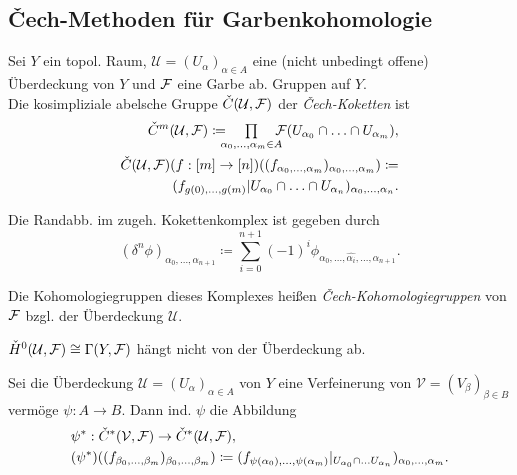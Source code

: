 \documentclass{cheat-sheet}
\newcommand{\nspace}[1]{\foreach \i in {1,...,#1}{ \! }} %
\begin{document}
\subsection{Čech-Methoden für Garbenkohomologie}


\begin{defn}
  Sei $Y$ ein topol. Raum, $\mathcal{U} = (U_\alpha)_{\alpha \in A}$ eine (nicht unbedingt offene) Überdeckung von $Y$ und $\mathcal{F}$ eine Garbe ab. Gruppen auf $Y$. \\
  Die kosimpliziale abelsche Gruppe $\check{C}(\mathcal{U}, \mathcal{F})$ der \emph{Čech-Koketten} ist
  \begin{align*}
    \check{C}^m(\mathcal{U}, \Fais) \coloneqq \nspace{4} \prod_{\alpha_0, \ldots, \alpha_m \in A} \nspace{4} \Fais(U_{\alpha_0} \cap \ldots \cap U_{\alpha_m}), \\
    \check{C}(\mathcal{U}, \Fais)(f : [m] \to [n])((f_{\alpha_0, \ldots ,\alpha_m})_{\alpha_0, \ldots, \alpha_m}) \coloneqq \\
    (f_{g(0), \ldots, g(m)}|U_{\alpha_0} \cap \ldots \cap U_{\alpha_n})_{\alpha_0, \nldots, \alpha_n}.
  \end{align*}
\end{defn}

\begin{bem}
  Die Randabb. im zugeh. Kokettenkomplex ist gegeben durch
  \[ (\delta^n \phi)_{\alpha_0, \ldots, \alpha_{n+1}} \coloneqq \sum_{i=0}^{n+1} (-1)^i \phi_{\alpha_0, \ldots, \hat{\alpha_i}, \ldots, \alpha_{n+1}}. \]
\end{bem}

\begin{defn}
  Die Kohomologiegruppen dieses Komplexes heißen \emph{Čech-Kohomologiegruppen} von $\mathcal{F}$ bzgl. der Überdeckung $\mathcal{U}$.
\end{defn}

\begin{bem}
  $\check{H}^0(\mathcal{U}, \mathcal{F}) \cong \Gamma(Y, \mathcal{F})$ hängt nicht von der Überdeckung ab.
\end{bem}

\begin{bem}
  Sei die Überdeckung $\mathcal{U} = (U_\alpha)_{\alpha \in A}$ von $Y$ eine Verfeinerung von $\mathcal{V} = (V_\beta)_{\beta \in B}$ vermöge $\psi : A \to B$.
  Dann ind. $\psi$ die Abbildung
  \begin{align*}
    & \psi^* : \check{C}^*(\mathcal{V}, \mathcal{F}) \to \check{C}^*(\mathcal{U}, \mathcal{F}), \\
    & (\psi^*)((f_{\beta_0, \ldots ,\beta_m})_{\beta_0, \ldots, \beta_m}) \coloneqq (f_{\psi(\alpha_0),\ldots,\psi(\alpha_m)}|_{U_{\alpha_0} \cap \ldots U_{\alpha_n}})_{\alpha_0, \ldots, \alpha_m}.
  \end{align*}
\end{bem}
\end{document}
